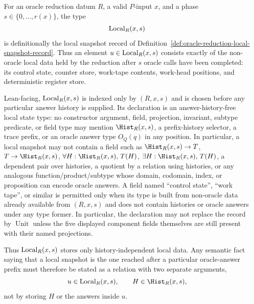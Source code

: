 \begin{definition}
  \label{def:oracle-reduction-local-snapshot}
  For an oracle reduction datum $R$, a valid $P$-input $x$, and a phase
  $s\in\{0,\ldots,r(x)\}$, the type
  \[
    \operatorname{Local}_R(x,s)
  \]
  is definitionally the local snapshot record of
  Definition~\ref{def:oracle-reduction-local-snapshot-record}.  Thus an element
  $u\in\operatorname{Local}_R(x,s)$ consists exactly of the non-oracle local data held by the
  reduction after $s$ oracle calls have been completed: its control state,
  counter store, work-tape contents, work-head positions, and deterministic
  register store.

  Lean-facing, $\operatorname{Local}_R(x,s)$ is indexed only by $(R,x,s)$ and is chosen
  before any particular answer history is supplied.  Its declaration is an
  answer-history-free local state type: no constructor argument, field,
  projection, invariant, subtype predicate, or field type may mention
  $\Hist_R(x,s)$, a prefix-history selector, a trace prefix, or an oracle
  answer type $O_Q(q)$ in any position.  In particular, a local snapshot may
  not contain a field such as
  $\Hist_R(x,s)\to T$, $T\to\Hist_R(x,s)$,
  $\forall H:\Hist_R(x,s),\,T(H)$,
  $\exists H:\Hist_R(x,s),\,T(H)$, a dependent pair over histories, a quotient
  by a relation using histories, or any analogous function/product/subtype
  whose domain, codomain, index, or proposition can encode oracle answers.
  A field named ``control state'', ``work tape'', or similar is permitted only
  when its type is built from non-oracle data already available from
  $(R,x,s)$ and does not contain histories or oracle answers under any type
  former.  In particular, the declaration may not replace the record by
  $\operatorname{Unit}$ unless the five displayed component fields themselves
  are still present with their named projections.

  Thus $\operatorname{Local}_R(x,s)$ stores only history-independent local data.  Any
  semantic fact saying that a local snapshot is the one reached after a
  particular oracle-answer prefix must therefore be stated as a relation with
  two separate arguments,
  \[
    u\in\Local_R(x,s),\qquad H\in\Hist_R(x,s),
  \]
  not by storing $H$ or the answers inside $u$.
\end{definition}

